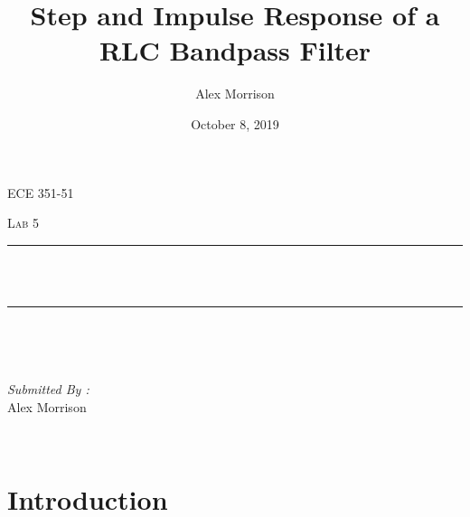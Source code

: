 \documentclass[12pt]{report}
\title{Step and Impulse Response of a RLC Bandpass Filter}
\author{ Alex Morrison}
\date{October 8, 2019}
\makeatletter
\let\thetitle\@title
\makeatother
\begin{document}

\begin{titlepage}
	\centering
    \vspace*{0.5 cm}
\begin{center}    \textsc{\Large ECE 351-51}\\[2.0 cm]	\end{center}%
	\textsc{\Large  Lab 5}\\[0.5 cm]				%
	\rule{\linewidth}{0.2 mm} \\[0.4 cm]
	{ \huge \bfseries \thetitle}\\
	\rule{\linewidth}{0.2 mm} \\[1.5 cm]
	
	\begin{minipage}{0.4\textwidth}
		\begin{flushleft} \large
			\end{flushleft}
			\end{minipage}~
			\begin{minipage}{0.4\textwidth}
            
			\begin{flushright} \large
			\emph{Submitted By :} \\
			Alex Morrison  
		\end{flushright}
           
	\end{minipage}\\[2 cm]
	

    
    
    
    
	
\end{titlepage}


\tableofcontents
\pagebreak

\renewcommand{\thesection}{\arabic{section}}
\section{Introduction}
 
\end{document}
